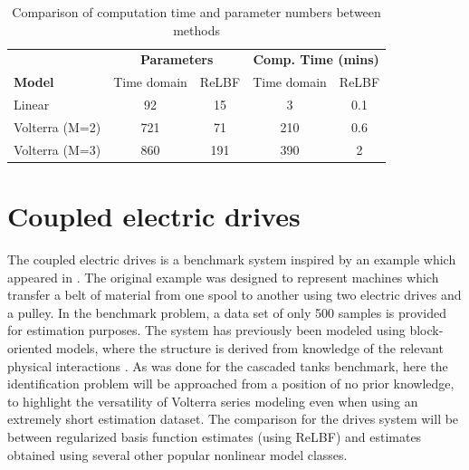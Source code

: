 \renewcommand{\arraystretch}{1.3}
\begin{table}[h]
\centering
\caption{Comparison of computation time and parameter numbers between methods}
\label{tab:Params+Times_tanks}
\begin{tabular}{|l||c|c||c|c|}
\hline
                & \multicolumn{2}{c||}{\textbf{Parameters}} & \multicolumn{2}{c|}{\textbf{Comp. Time (mins)}}  \\ \cline{2-5} 
\textbf{Model} & Time domain         & ReLBF            &Time domain           & ReLBF                \\ \hline
Linear                   & 92                     & 15    &   3          &  0.1 \\ \hline
Volterra (M=2)                 & 721      &  71        & 210             &  0.6                \\ \hline
Volterra (M=3)                     & 860      & 191      & 390             &  2                 \\ \hline
\end{tabular}
\end{table}


\section{Coupled electric drives}

The coupled electric drives is a benchmark system inspired by an example which appeared in \cite{Wellstead1979}. The original example was designed to represent machines which transfer a belt of material from one spool to another using two electric drives and a pulley. In the benchmark problem, a data set of only 500 samples is provided for estimation purposes. The system has previously been modeled using block-oriented models, where the structure is derived from knowledge of the relevant physical interactions \cite{Wigren2017}. As was done for the cascaded tanks benchmark, here the identification problem will be approached from a position of no prior knowledge, to highlight the versatility of Volterra series modeling even when using an extremely short estimation dataset. The comparison for the drives system will be between regularized basis function estimates (using ReLBF) and estimates obtained using several other popular nonlinear model classes. 

